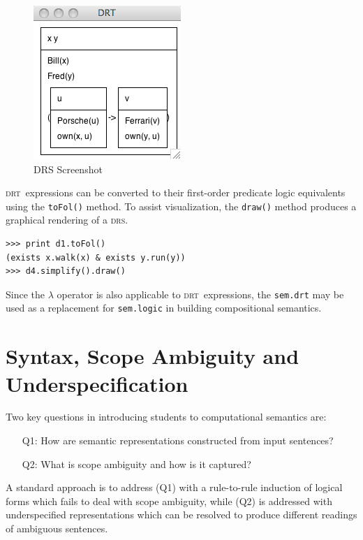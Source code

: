 \documentclass[11pt, a4paper]{article}
\newcommand{\DRS}{\textsc{drs}}
\newcommand{\DRT}{\textsc{drt}}
\newcommand{\dhgcode}[1]{{\tt #1}}
\begin{document}
\begin{figure}
\vspace{-5ex}
\begin{center}
   \includegraphics[scale=.5]{drs.png}

 \end{center}
\vspace{-4ex}
\caption{DRS Screenshot} 
\vspace{-5ex}
\end{figure}
\noindent
\DRT\ expressions can be converted to their first-order predicate
logic equivalents using the \dhgcode{toFol()} method. To assist
visualization, the \texttt{draw()} method produces a graphical
rendering of a \DRS.
\begin{Verbatim}[frame=none]
>>> print d1.toFol()
(exists x.walk(x) & exists y.run(y))
>>> d4.simplify().draw()
\end{Verbatim}

Since the $\lambda$ operator is also applicable to \DRT\ expressions,
the \dhgcode{sem.drt} may be used as a replacement for
\dhgcode{sem.logic} in building compositional semantics.

\section{Syntax, Scope Ambiguity and Underspecification}

Two key questions in introducing students to computational semantics are:
\begin{enumerate}
\item[Q1:] How are semantic representations constructed from input
  sentences?
\vspace{-2ex}
\item[Q2:] What is scope ambiguity and how is it captured?
\end{enumerate}
A standard approach is to address (Q1) with a rule-to-rule induction of
logical forms which fails to deal with scope ambiguity, while (Q2) is
addressed with underspecified representations
which can be resolved to produce different readings of ambiguous
sentences. 
\end{document}
